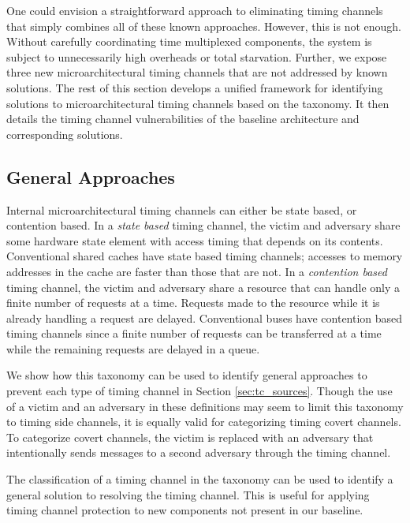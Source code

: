 One could envision a straightforward approach to eliminating timing channels 
that simply combines all of these known approaches. However, this is not 
enough. Without carefully coordinating time multiplexed components, the system 
is subject to unnecessarily high overheads or total starvation.  Further, we 
expose three new microarchitectural timing channels that are not addressed by 
known solutions. The rest of this section develops a unified framework for 
identifying solutions to microarchitectural timing channels based on the 
taxonomy. It then details the timing channel vulnerabilities of the baseline 
architecture and corresponding solutions.

\subsection{General Approaches}


Internal microarchitectural timing channels can either be state based, or 
contention based. In a \emph{state based} timing channel, the victim and 
adversary share some hardware state element with access timing that depends on 
its contents. Conventional shared caches have state based timing channels; 
accesses to memory addresses in the cache are faster than those that are not.
In a \emph{contention based} timing channel, the victim and adversary share a 
resource that can handle only a finite number of requests at a time.  Requests 
made to the resource while it is already handling a request are delayed. 
Conventional buses have contention based timing channels since a finite number 
of requests can be transferred at a time while the remaining requests are 
delayed in a queue.

We show how this taxonomy can be used to identify general approaches to prevent 
each type of timing channel in Section \ref{sec:tc_sources}. Though the use of 
a victim and an adversary in these definitions may seem to limit this taxonomy 
to timing side channels, it is equally valid for categorizing timing covert 
channels. To categorize covert channels, the victim is replaced with an 
adversary that intentionally sends messages to a second adversary through the 
timing channel.

The classification of a timing channel in the taxonomy can be used to identify 
a general solution to resolving the timing channel. This is useful for applying 
timing channel protection to new components not present in our baseline.  
